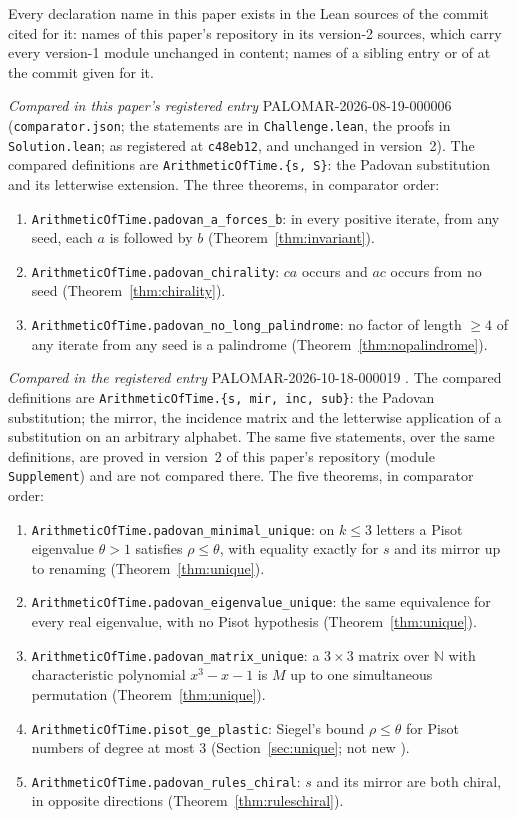 \documentclass[11pt]{amsart}
\theoremstyle{plain}
\theoremstyle{definition}
\theoremstyle{remark}
\begin{document}
Every declaration name in this paper exists in the Lean sources of the commit cited for it:
names of this paper's repository in its version-2 sources, which carry every version-1 module
unchanged in content; names of a sibling entry or of \cite{pdtlean} at the commit given for it.

\emph{Compared in this paper's registered entry} PALOMAR-2026-08-19-000006 \cite{palomar-aot}
(\texttt{comparator.json}; the statements are in \texttt{Challenge.lean}, the proofs in
\texttt{Solution.lean}; as registered at \texttt{c48eb12}, and unchanged in version~2). The
compared definitions are \texttt{ArithmeticOfTime.\{s, S\}}: the Padovan substitution and its
letterwise extension. The three theorems, in comparator order:
\begin{enumerate}
\item \texttt{ArithmeticOfTime.padovan\_a\_forces\_b}: in every positive iterate, from any seed,
each $a$ is followed by $b$ (Theorem~\ref{thm:invariant}).
\item \texttt{ArithmeticOfTime.padovan\_chirality}: $ca$ occurs and $ac$ occurs from no seed
(Theorem~\ref{thm:chirality}).
\item \texttt{ArithmeticOfTime.padovan\_no\_long\_palindrome}: no factor of length $\ge 4$ of any
iterate from any seed is a palindrome (Theorem~\ref{thm:nopalindrome}).
\end{enumerate}

\emph{Compared in the registered entry} PALOMAR-2026-10-18-000019 \cite{palomar-slowclock}. The
compared definitions are \texttt{ArithmeticOfTime.\{s, mir, inc, sub\}}: the Padovan
substitution; the mirror, the incidence matrix and the letterwise application of a substitution
on an arbitrary alphabet. The same five statements, over the same definitions, are proved in
version~2 of this paper's repository (module \texttt{Supplement}) and are not compared there.
The five theorems, in comparator order:
\begin{enumerate}
\item \texttt{ArithmeticOfTime.padovan\_minimal\_unique}: on $k \le 3$ letters a Pisot eigenvalue
$\theta > 1$ satisfies $\rho \le \theta$, with equality exactly for $s$ and its mirror up to
renaming (Theorem~\ref{thm:unique}).
\item \texttt{ArithmeticOfTime.padovan\_eigenvalue\_unique}: the same equivalence for every real
eigenvalue, with no Pisot hypothesis (Theorem~\ref{thm:unique}).
\item \texttt{ArithmeticOfTime.padovan\_matrix\_unique}: a $3 \times 3$ matrix over $\mathbb{N}$
with characteristic polynomial $x^3 - x - 1$ is $M$ up to one simultaneous permutation
(Theorem~\ref{thm:unique}).
\item \texttt{ArithmeticOfTime.pisot\_ge\_plastic}: Siegel's bound $\rho \le \theta$ for Pisot
numbers of degree at most $3$ (Section~\ref{sec:unique}; not new \cite{siegel1944}).
\item \texttt{ArithmeticOfTime.padovan\_rules\_chiral}: $s$ and its mirror are both chiral, in
opposite directions (Theorem~\ref{thm:ruleschiral}).
\end{enumerate}
\end{document}
